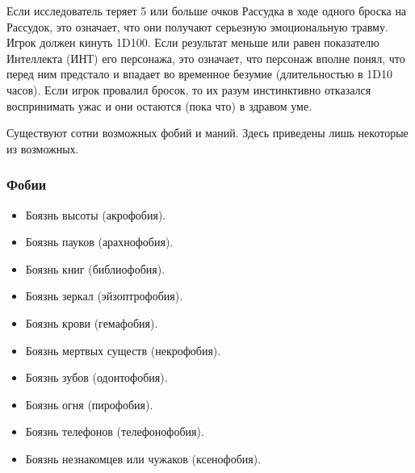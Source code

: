 \documentclass[letterpaper,twocolumn,openany, twoside, 11pt, usenames]{cocbook}
\begin{document}
Если исследователь теряет 5 или больше очков Рассудка в ходе одного броска на Рассудок, это означает, что они получают серьезную эмоциональную травму. Игрок должен кинуть 1D100. Если результат меньше или равен показателю Интеллекта (ИНТ) его персонажа, это означает, что персонаж вполне понял, что перед ним предстало и впадает во временное безумие (длительностью в  1D10 часов). Если игрок провалил бросок, то их разум инстинктивно отказался воспринимать ужас и они остаются (пока что) в здравом уме.
\begin{fullcocpaperbox}{}{}
  Существуют сотни возможных фобий и маний. Здесь приведены лишь некоторые из возможных.
  \begin{multicols}{2}
  \subsubsection*{Фобии}
  \begin{itemize}[leftmargin=4mm]
  \item Боязнь высоты (акрофобия).
  \item Боязнь пауков (арахнофобия).
  \item Боязнь книг (библиофобия).
  \item Боязнь зеркал (эйзоптрофобия).
  \item Боязнь крови (гемафобия).
  \item Боязнь мертвых существ (некрофобия).
  \item Боязнь зубов (одонтофобия).
  \item Боязнь огня (пирофобия).
  \item Боязнь телефонов (телефонофобия).
  \item Боязнь незнакомцев или чужаков (ксенофобия).
\end{itemize}

\end{multicols}
\end{fullcocpaperbox}
\end{document}
